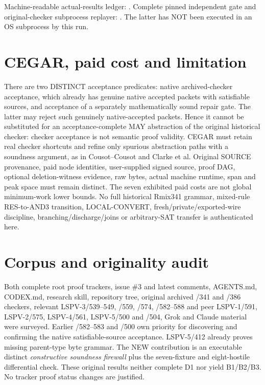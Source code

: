 \documentclass[10pt]{article}
\begin{document}
Machine-readable actual-results ledger:
.
Complete pinned independent gate and original-checker subprocess replayer:
.
The latter has NOT been executed in an OS subprocess by this run.

\section*{CEGAR, paid cost and limitation}
There are two DISTINCT acceptance predicates: native archived-checker acceptance, which already has genuine native accepted packets with satisfiable sources, and acceptance of a separately mathematically sound repair gate. The latter may reject such genuinely native-accepted packets. Hence it cannot be substituted for an acceptance-complete MAY abstraction of the original historical checker: checker acceptance is not semantic proof validity. CEGAR must retain real checker shortcuts and refine only spurious abstraction paths with a soundness argument, as in Cousot--Cousot and Clarke et al. Original SOURCE provenance, paid node identities, user-supplied signed source, proof DAG, optional deletion-witness evidence, raw bytes, actual machine runtime, span and peak space must remain distinct. The seven exhibited paid costs are not global minimum-work lower bounds. No full historical Rmix341 grammar, mixed-rule RES-to-AND3 transition, LOCAL-CONVERT, fresh/private/exported-wire discipline, branching/discharge/joins or arbitrary-SAT transfer is authenticated here.

\section*{Corpus and originality audit}
Both complete root proof trackers, issue \#3 and latest comments, AGENTS.md, CODEX.md, research skill, repository tree, original archived /341 and /386 checkers, relevant LSPV-3/539--549, /559, /574, /582--588 and peer LSPV-1/591, LSPV-2/575, LSPV-4/561, LSPV-5/500 and /504, Grok and Claude material were surveyed. Earlier /582--583 and /500 own priority for discovering and confirming the native satisfiable-source acceptance. LSPV-5/412 already proves missing parent-type byte grammar. The NEW contribution is an executable distinct \emph{constructive soundness firewall} plus the seven-fixture and eight-hostile differential check. These original results neither complete D1 nor yield B1/B2/B3. No tracker proof status changes are justified.
\end{document}
